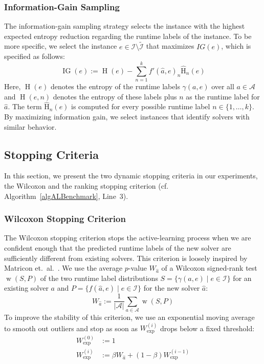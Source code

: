 \documentclass[sn-basic, Numbered]{sn-jnl} %
\begin{document}
\subsubsection{Information-Gain Sampling}

The information-gain sampling strategy selects the instance with the highest expected entropy reduction regarding the runtime labels of the instance.
To be more specific, we select the instance $e \in \mathcal{I} \setminus \tilde{\mathcal{I}}$ that maximizes $IG(e)$, which is specified as follows:
%
\begin{equation*}
  \operatorname{IG}(e) := \operatorname{H}(e) - \sum_{n = 1}^{k} f'(\hat{a}, e)_{n} \operatorname{\hat H}_n(e)
\end{equation*}
%
Here, $\operatorname{H}(e)$ denotes the entropy of the runtime labels $\gamma(a, e)$ over all $a \in \mathcal{A}$ and $\operatorname{H}(e, n)$ denotes the entropy of these labels plus $n$ as the runtime label for $\hat{a}$.
The term $\operatorname{\hat H}_n(e)$ is computed for every possible runtime label $n \in \{1, \dots, k\}$.
By maximizing information gain, we select instances that identify solvers with similar behavior.

\subsection{Stopping Criteria}
\label{sec:main:stopping}

In this section, we present the two dynamic stopping criteria in our experiments, the Wilcoxon and the ranking stopping criterion (cf. Algorithm~\ref{algALBenchmark}, Line~3).

\subsubsection{Wilcoxon Stopping Criterion}

The Wilcoxon stopping criterion stops the active-learning process when we are confident enough that the predicted runtime labels of the new solver are sufficiently different from existing solvers.
This criterion is loosely inspired by Matricon et.~al.~\cite{MatriconAFSH21}.
We use the average $p$-value $W_{\hat{a}}$ of a Wilcoxon signed-rank test $\operatorname{w}(S,P)$ of the two runtime label distributions $S=\{ \gamma(a, e) \mid e \in \mathcal{I} \}$ for an existing solver $a$ and \mbox{$P=\{ f(\hat a, e) \mid e \in \mathcal{I} \}$} for the new solver $\hat{a}$:
%
\begin{equation*}
  W_{\hat{a}} := \frac{1}{\lvert \mathcal{A} \rvert} \sum_{a \in \mathcal{A}} \operatorname{w}(S, P)
\end{equation*}
%
To improve the stability of this criterion, we use an exponential moving average to smooth out outliers and stop as soon as $W^{(i)}_{\exp}$ drops below a fixed threshold:
%
\begin{align*}
  W_{\exp}^{\left(0\right)} &:= 1\\
  W_{\exp}^{\left(i\right)} &:= \beta W_{\hat{a}} + \left(1 - \beta\right) W_{\exp}^{\left(i - 1\right)}
\end{align*}
\end{document}
